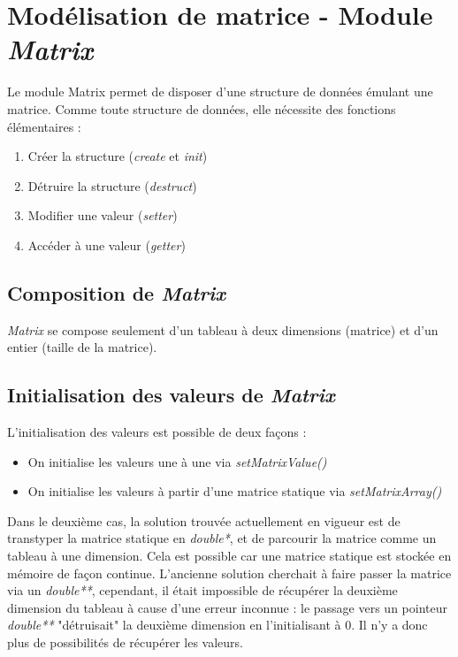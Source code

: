 \chapter{Modélisation de matrice - Module \textit{Matrix}}

Le module Matrix permet de disposer d'une structure de données émulant une matrice. Comme toute structure de données, elle nécessite des fonctions élémentaires :

\begin{enumerate}
	\item Créer la structure (\textit{create} et \textit{init})
	\item Détruire la structure (\textit{destruct})
	\item Modifier une valeur (\textit{setter})
	\item Accéder à une valeur (\textit{getter})
\end{enumerate}

\section{Composition de \textit{Matrix}}

\textit{Matrix} se compose seulement d'un tableau à deux dimensions (matrice) et d'un entier (taille de la matrice).

\lstset{style=customc}


\section{Initialisation des valeurs de \textit{Matrix}}

L'initialisation des valeurs est possible de deux façons :
\begin{itemize}
	\item On initialise les valeurs une à une via \textit{setMatrixValue()}
	\item On initialise les valeurs à partir d'une matrice statique via \textit{setMatrixArray()}
\end{itemize}

Dans le deuxième cas, la solution trouvée actuellement en vigueur est de transtyper la matrice statique en \textit{double*}, et de parcourir la matrice comme un tableau à une dimension. Cela est possible car une matrice statique est stockée en mémoire de façon continue. 
L'ancienne solution cherchait à faire passer la matrice via un \textit{double**}, cependant, il était impossible de récupérer la deuxième dimension du tableau à cause d'une erreur inconnue : le passage vers un pointeur \textit{double**} "détruisait" la deuxième dimension en l'initialisant à 0. Il n'y a donc plus de possibilités de récupérer les valeurs.

